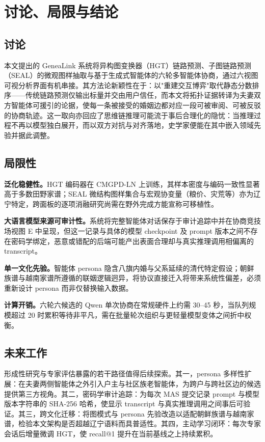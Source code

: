 \chapter{讨论、局限与结论}\label{chap:conclusion}

\section{讨论}\label{sec:conclusion-discussion}

本文提出的 GeneaLink 系统将异构图变换器（HGT）链路预测\citep{hu2020hgt}、子图链路预测（SEAL）的微观图样抽取\citep{zhang2018seal}与基于生成式智能体\citep{park2023generative}的六轮多智能体协商，通过六视图可视分析界面有机串接。其方法论新颖性在于：以"重建交互博弈"取代静态分数排序——传统链路预测仅输出标量并交由用户信任，而本文将拓扑证据转译为夫妻双方智能体可援引的论据，使每一条被接受的婚姻边都对应一段可被审阅、可被反驳的协商轨迹。这一取向亦回应了思维链推理可能流于事后合理化\citep{turpin2023faithfulness}的隐忧：当推理过程不再以模型独白展开，而以双方对抗与对齐落地，史学家便能在其中嵌入领域先验并据此调整。

\section{局限性}\label{sec:conclusion-limit}

\textbf{泛化稳健性。}HGT 编码器在 CMGPD-LN 上训练，其样本密度与编码一致性显著高于多数田野家谱；SEAL 微结构图样集合与宏观协变量（粮价、灾荒等）亦为辽宁特定，跨面板的逐项消融研究尚需在野外完成方能宣称可移植性。

\textbf{大语言模型来源可审计性。}系统将完整智能体对话保存于审计追踪中并在协商竞技场视图 E 中呈现，但这一记录与具体的模型 checkpoint 及 prompt 版本之间不存在密码学绑定，恶意或错配的后端可能产出表面合理却与真实推理调用相偏离的 transcript。

\textbf{单一文化先验。}智能体 persona 隐含八旗内婚与父系延续的清代特定假设；朝鲜族谱与越南家谱所遵循的联姻逻辑迥异，将协议直接迁入将带来系统性偏差，必须重新设计 persona 而非仅替换输入数据。

\textbf{计算开销。}六轮六候选的 Qwen 单次协商在常规硬件上约需 30--45 秒，当队列规模超过 20 时累积等待非平凡，需在批量轮次组织与更轻量模型变体之间折中权衡。

\section{未来工作}\label{sec:conclusion-future}

形成性研究与专家评估暴露的若干路径值得后续探索。其一，persona 多样性扩展：在夫妻两侧智能体之外引入户主与社区族老智能体，为跨户与跨社区边的候选提供第三方视角。其二，密码学审计追踪：为每次 MAS 提交记录 prompt 与模型版本字符串的 SHA-256 哈希，使显示 transcript 与真实推理调用之间事后可验证。其三，跨文化迁移：将图模式与 persona 先验改造以适配朝鲜族谱与越南家谱，检验本文架构是否超越辽宁语料而具普适性。其四，主动学习闭环：每次专家会话后增量微调 HGT，使 recall@1 提升在当前基线之上持续累积。

